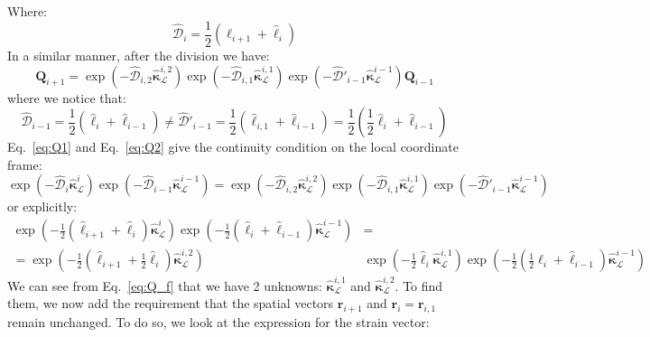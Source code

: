 \documentclass[a4paper, 11pt]{article}
\begin{document}
Where:
\begin{equation}
    \hat{\mathcal{D}}_i=\frac{1}{2}(\hat{\ell}_{i+1}+\hat{\ell}_{i})
\end{equation}
In a similar manner, after the division we have:
\begin{equation}\label{eq:Q2}
    \boldsymbol{Q}_{i+1}=\exp\left(-\hat{\mathcal{D}}_{i,2}\hat{\boldsymbol{\kappa}}^{i,2}_\mathcal{L}\right)\exp\left(-\hat{\mathcal{D}}_{i,1}\hat{\boldsymbol{\kappa}}^{i,1}_\mathcal{L}\right)\exp\left(-\hat{\mathcal{D}}'_{i-1}\hat{\boldsymbol{\kappa}}^{i-1}_\mathcal{L}\right)\boldsymbol{Q}_{i-1}
\end{equation}
where we notice that:
\begin{equation}
    \hat{\mathcal{D}}_{i-1}=\frac{1}{2}(\hat{\ell}_{i}+\hat{\ell}_{i-1})\neq\hat{\mathcal{D}}'_{i-1}=\frac{1}{2}(\hat{\ell}_{i,1}+\hat{\ell}_{i-1})=\frac{1}{2}(\frac{1}{2}\hat{\ell}_{i}+\hat{\ell}_{i-1})
\end{equation}
Eq.~\ref{eq:Q1} and Eq.~\ref{eq:Q2} give the continuity condition on the local coordinate frame:
\begin{equation}
    \exp\left(-{\hat{\mathcal{D}}_i\hat{\boldsymbol{\kappa}}^i_\mathcal{L}}\right)\exp\left(-\hat{\mathcal{D}}_{i-1}\hat{\boldsymbol{\kappa}}^{i-1}_\mathcal{L}\right)=\exp\left(-\hat{\mathcal{D}}_{i,2}\hat{\boldsymbol{\kappa}}^{i,2}_\mathcal{L}\right)\exp\left(-\hat{\mathcal{D}}_{i,1}\hat{\boldsymbol{\kappa}}^{i,1}_\mathcal{L}\right)\exp\left(-\hat{\mathcal{D}}'_{i-1}\hat{\boldsymbol{\kappa}}^{i-1}_\mathcal{L}\right)
\end{equation}
or explicitly:
\begin{align}\label{eq:Q_f}
    \exp\left(-{\frac{1}{2}(\hat{\ell}_{i+1}+\hat{\ell}_{i})\hat{\boldsymbol{\kappa}}^i_\mathcal{L}}\right)\exp\left(-\frac{1}{2}(\hat{\ell}_{i}+\hat{\ell}_{i-1})\hat{\boldsymbol{\kappa}}^{i-1}_\mathcal{L}\right)&=\nonumber\\
    =\exp\left(-\frac{1}{2}(\hat{\ell}_{i+1}+\frac{1}{2}\hat{\ell}_{i})\hat{\boldsymbol{\kappa}}^{i,2}_\mathcal{L}\right)&\exp\left(-\frac{1}{2}\hat{\ell}_i\hat{\boldsymbol{\kappa}}^{i,1}_\mathcal{L}\right)\exp\left(-\frac{1}{2}(\frac{1}{2}\hat{\ell}_{i}+\hat{\ell}_{i-1})\hat{\boldsymbol{\kappa}}^{i-1}_\mathcal{L}\right)
\end{align}
We can see from Eq.~\ref{eq:Q_f} that we have 2 unknowns: $\hat{\boldsymbol{\kappa}}^{i,1}_\mathcal{L}$ and $\hat{\boldsymbol{\kappa}}^{i,2}_\mathcal{L}$. To find them, we now add the requirement that the spatial vectors $\boldsymbol{r}_{i+1} $ and $\boldsymbol{r}_{i}=\boldsymbol{r}_{i,1}$ remain unchanged. To do so, we look at the expression for the strain vector:
\end{document}
